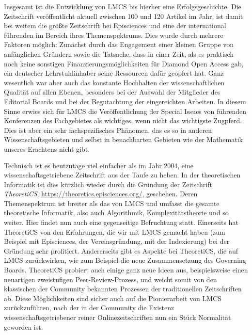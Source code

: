\documentclass[a4paper,
fontsize=11pt,
oneside,
numbers=noperiodatend,
parskip=half-,
bibliography=totoc,
final
]{scrartcl}
\begin{document}
Insgesamt ist die Entwicklung von LMCS bis hierher eine
Erfolgsgeschichte. Die Zeitschrift veröffentlicht aktuell zwischen 100
und 120 Artikel im Jahr, ist damit bei weitem die größte Zeitschrift bei
Episciences und eine der international führenden im Bereich ihres
Themenspektrums. Dies wurde durch mehrere Faktoren möglich: Zunächst
durch das Engagement einer kleinen Gruppe von anfänglichen Gründern
sowie die Tatsache, dass in einer Zeit, als es praktisch noch keine
sonstigen Finanzierungsmöglichkeiten für Diamond Open Access gab, ein
deutscher Lehrstuhlinhaber seine Ressourcen dafür geopfert hat. Ganz
wesentlich war aber auch das konstante Hochhalten der wissenschaftlichen
Qualität auf allen Ebenen, besonders bei der Auswahl der Mitglieder des
Editorial Boards und bei der Begutachtung der eingereichten Arbeiten. In
diesem Sinne erwies sich für LMCS die Veröffentlichung der Special
Issues von führenden Konferenzen des Fachgebietes als wichtiges, wenn
nicht das wichtigste Zugpferd. Dies ist aber ein sehr fachspezifisches
Phänomen, das es so in anderen Wissenschaftsgebieten und selbst in
benachbarten Gebieten wie der Mathematik unseres Erachtens nicht gibt.

Technisch ist es heutzutage viel einfacher als im Jahr 2004, eine
wissenschaftsgetriebene Zeitschrift aus der Taufe zu heben. In der
theoretischen Informatik ist dies kürzlich wieder durch die Gründung der
Zeitschrift \emph{TheoretiCS},
\url{https://theoretics.episciences.org/}, geschehen. Deren
Themenspektrum ist breiter als das von LMCS und umfasst die gesamte
theoretische Informatik, also auch Algorithmik, Komplexitätstheorie und
so weiter. Hier findet nun auch eine gegenseitige Befruchtung statt.
Einerseits hat TheoretiCS von den Erfahrungen, die wir mit LMCS gemacht
haben (zum Beispiel mit Episciences, der Vereinsgründung, mit der
Indexierung) bei der Gründung sehr profitiert. Andererseits gibt es
Aspekte bei TheoretiCS, die auf LMCS zurückwirken, wie zum Beispiel die
neue Zusammensetzung des Governing Boards. TheoretiCS probiert auch
einige ganz neue Ideen aus, beispielsweise einen neuartigen zweistufigen
Peer-Review-Prozess, und weicht somit von den klassischen der Community
bekannten Prozessen der traditionellen Zeitschriften ab. Diese
Möglichkeiten sind sicher auch auf die Pionierarbeit von LMCS
zurückzuführen, nach der in der Community die Existenz
wissenschaftsgetriebener reiner Onlinezeitschriften nun ein Stück
Normalität geworden ist.
\end{document}
